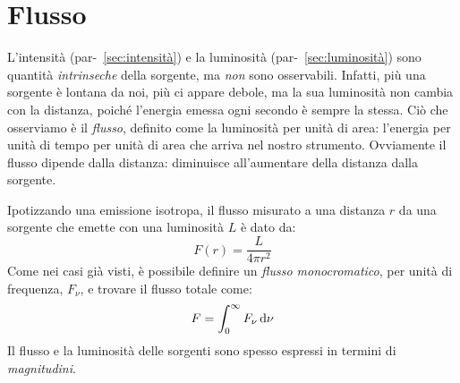 \section{Flusso}\label{sec:flusso}
L'intensità (par-~\ref{sec:intensità}) e la luminosità (par-~\ref{sec:luminosità}) sono quantità \emph{intrinseche} della sorgente, ma \emph{non} sono osservabili. Infatti, più una sorgente è lontana da noi, più ci appare debole, ma la sua luminosità non cambia con la distanza, poiché l'energia emessa ogni secondo è sempre la stessa. Ciò che osserviamo è il \emph{flusso}, definito come la luminosità per unità di area: l'energia per unità di tempo per unità di area che arriva nel nostro strumento. Ovviamente il flusso dipende dalla distanza: diminuisce all'aumentare della distanza dalla sorgente.

Ipotizzando una emissione isotropa, il flusso misurato a una distanza $r$ da una sorgente che emette con una luminosità $L$ è dato da:
\begin{equation}\label{eq:flusso}
    F(r) = \frac{L}{4 \pi r^2}
\end{equation}
Come nei casi già visti, è possibile definire un \emph{flusso monocromatico}, per unità di frequenza, $F_\nu$, e trovare il flusso totale come:
\[
    F = \int_0^\infty F_\nu \mathop{}\!\mathrm{d} \nu
\]
Il flusso e la luminosità delle sorgenti sono spesso espressi in termini di \emph{magnitudini}.